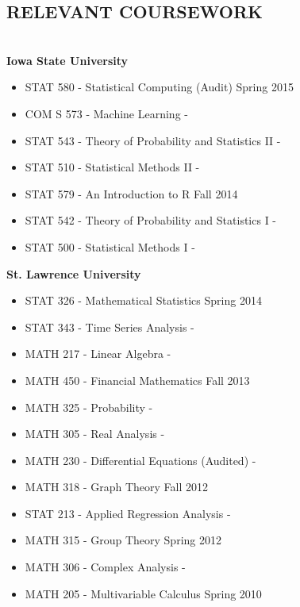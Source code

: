 \documentclass[10pt]{res} %
\begin{document}
\begin{resume}

\section{RELEVANT COURSEWORK}

\hrulefill \\
{\bf Iowa State University }
\begin{itemize}\itemsep -2pt
\item STAT 580 - Statistical Computing (Audit) \hfill Spring 2015
\item COM S 573 - Machine Learning \hfill -
\item STAT 543 - Theory of Probability and Statistics II \hfill -
\item STAT 510 - Statistical Methods II \hfill -
\item STAT 579 - An Introduction to R \hfill Fall 2014
\item STAT 542 - Theory of Probability and Statistics I \hfill -
\item STAT 500 - Statistical Methods I \hfill -
\end{itemize}

{\bf St. Lawrence University }
\begin{itemize}\itemsep -2pt
\item STAT 326 - Mathematical Statistics \hfill Spring 2014
\item STAT 343 - Time Series Analysis \hfill - 
\item MATH 217 - Linear Algebra \hfill -
\item MATH 450 - Financial Mathematics \hfill Fall 2013
\item MATH 325 - Probability \hfill - 
\item MATH 305 - Real Analysis \hfill - 
\item MATH 230 - Differential Equations (Audited) \hfill -
\item MATH 318 - Graph Theory \hfill Fall 2012
\item STAT 213 - Applied Regression Analysis \hfill - 
\item MATH 315 - Group Theory \hfill Spring 2012
\item MATH 306 - Complex Analysis \hfill -
\item MATH 205 - Multivariable Calculus \hfill Spring 2010
\end{itemize}


\end{resume} 
\end{document}
